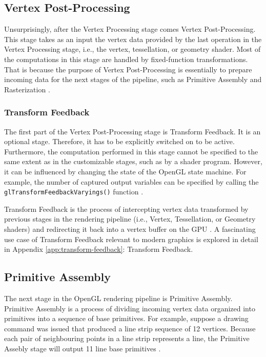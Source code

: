 \documentclass[
  digital,     %
  oneside,     %
  nosansbold,  %
  nocolorbold, %
  lof,         %
  lot,         %
]{fithesis4}
\begin{document}
\subsection{Vertex Post-Processing}
Unsurprisingly, after the Vertex Processing stage comes Vertex Post-Processing. This stage takes as an input
the vertex data provided by the last operation in the Vertex Processing stage, i.e., the vertex, tessellation, or geometry shader.
Most of the computations in this stage are handled by fixed-function transformations. That is because the purpose
of Vertex Post-Processing is essentially to prepare incoming data for the next stages of the pipeline, such as Primitive Assembly
and Rasterization \cite{openglwiki-vertex-post-processing}.

\subsubsection{Transform Feedback}
The first part of the Vertex Post-Processing stage is Transform Feedback. It is an optional stage.
Therefore, it has to be explicitly switched on to be active. Furthermore, the computation
performed in this stage cannot be specified to the same extent as in the customizable stages, such as by a shader program.
However, it can be influenced by changing the state of the OpenGL state machine. For example,
the number of captured output variables can be specified
by calling the \verb|glTransformFeedbackVaryings()| function \cite{openglwiki-transform-feedback}.

Transform Feedback is the process of intercepting vertex data transformed by previous stages
in the rendering pipeline (i.e., Vertex, Tessellation, or Geometry shaders) and redirecting it
back into a vertex buffer on the GPU \cite{openglwiki-transform-feedback}. A fascinating use case
of Transform Feedback relevant to modern graphics is explored in detail in Appendix \ref{app:transform-feedback}:
Transform Feedback.

\subsection{Primitive Assembly}
The next stage in the OpenGL rendering pipeline is Primitive Assembly.
Primitive Assembly is a process of dividing incoming vertex data organized into primitives into a sequence
of base primitives. For example, suppose a drawing command was issued that produced a line strip sequence of 12 vertices.
Because each pair of neighbouring points in a line strip represents a line, the Primitive Assebly stage will output
11 line base primitives \cite{openglwiki-primitive-assembly}.
\end{document}
